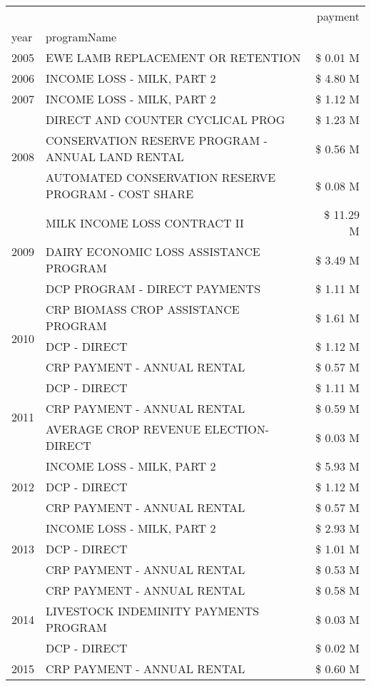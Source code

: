 \begin{tabular}{llr}
\toprule
 &  & payment \\
year & programName &  \\
\midrule
2005 & EWE LAMB REPLACEMENT OR RETENTION & \$ 0.01 M \\
\cline{1-3}
2006 & INCOME LOSS - MILK, PART 2 & \$ 4.80 M \\
\cline{1-3}
2007 & INCOME LOSS - MILK, PART 2 & \$ 1.12 M \\
\cline{1-3}
\multirow[t]{3}{*}{2008} & DIRECT AND COUNTER CYCLICAL PROG & \$ 1.23 M \\
 & CONSERVATION RESERVE PROGRAM - ANNUAL LAND RENTAL & \$ 0.56 M \\
 & AUTOMATED CONSERVATION RESERVE PROGRAM - COST SHARE & \$ 0.08 M \\
\cline{1-3}
\multirow[t]{3}{*}{2009} & MILK INCOME LOSS CONTRACT II & \$ 11.29 M \\
 & DAIRY ECONOMIC LOSS ASSISTANCE PROGRAM & \$ 3.49 M \\
 & DCP PROGRAM - DIRECT PAYMENTS & \$ 1.11 M \\
\cline{1-3}
\multirow[t]{3}{*}{2010} & CRP BIOMASS CROP ASSISTANCE PROGRAM & \$ 1.61 M \\
 & DCP - DIRECT & \$ 1.12 M \\
 & CRP PAYMENT - ANNUAL RENTAL & \$ 0.57 M \\
\cline{1-3}
\multirow[t]{3}{*}{2011} & DCP - DIRECT & \$ 1.11 M \\
 & CRP PAYMENT - ANNUAL RENTAL & \$ 0.59 M \\
 & AVERAGE CROP REVENUE ELECTION-DIRECT & \$ 0.03 M \\
\cline{1-3}
\multirow[t]{3}{*}{2012} & INCOME LOSS - MILK, PART 2 & \$ 5.93 M \\
 & DCP - DIRECT & \$ 1.12 M \\
 & CRP PAYMENT - ANNUAL RENTAL & \$ 0.57 M \\
\cline{1-3}
\multirow[t]{3}{*}{2013} & INCOME LOSS - MILK, PART 2 & \$ 2.93 M \\
 & DCP - DIRECT & \$ 1.01 M \\
 & CRP PAYMENT - ANNUAL RENTAL & \$ 0.53 M \\
\cline{1-3}
\multirow[t]{3}{*}{2014} & CRP PAYMENT - ANNUAL RENTAL & \$ 0.58 M \\
 & LIVESTOCK INDEMINITY PAYMENTS PROGRAM & \$ 0.03 M \\
 & DCP - DIRECT & \$ 0.02 M \\
\cline{1-3}
\multirow[t]{3}{*}{2015} & CRP PAYMENT - ANNUAL RENTAL & \$ 0.60 M \\

\end{tabular}
